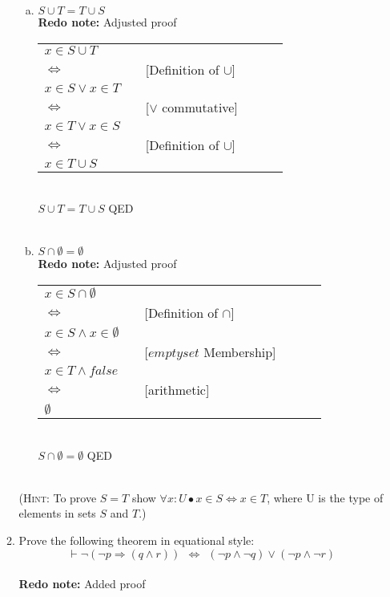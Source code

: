 \documentclass{article}
\renewcommand{\implies}{\Rightarrow}
\renewcommand{\iff}{\Leftrightarrow}
\begin{document}
\begin{enumerate}[\bf I.]
\begin{enumerate}[1.]
\begin{enumerate}[a.]
\item $S\cup T=T\cup S$ \\
  \textbf{Redo note:} Adjusted proof \\
 \begin{tabular}{l ll lll}
     $x \in S \cup T $  &    &  \\
     $\iff$ &   & [Definition of $\cup$] \\
     $x \in S \lor x \in T$  &    &  \\
     $\iff$ &   & [$\lor$ commutative] \\
     $ x \in T \lor x \in S$  & & \\
     $\iff$  &   & [Definition of $\cup$]  \\
     $x \in T \cup S $  &    &  \\
 \end{tabular} \\
 $S\cup T=T\cup S$ QED \\
\\  
\item $S\cap\emptyset= \emptyset$ \\
  \textbf{Redo note:} Adjusted proof \\
  \begin{tabular}{l ll lll}
     $ x \in S\cap\emptyset$  &    &  \\
    $\iff$ &   & [Definition of $\cap$] \\
    $x \in S \land x \in \emptyset $ & & \\
    $\iff$ &   & [$emptyset$ Membership]\\
    $ x \in T \land false $ & &\\
    $\iff$ &   & [arithmetic] \\
    ${\emptyset}$ & & \\
  \end{tabular} \\
  $S\cap\emptyset= \emptyset$ QED \\
\\ 
\end{enumerate}
(\textsc{Hint}: To prove $S=T$ show $\forall x: U \bullet x \in S\Leftrightarrow x\in T$, where U is the type of elements in sets $S$ and $T$.)
\item Prove the following theorem in equational style:
  $$ \vdash \neg(\neg p \implies (q\land r))~~\iff~~(\neg p\land \neg q)\lor(\neg p\land\neg r)$$ \\
  \textbf{Redo note:} Added proof \\ 

\end{enumerate}
\end{enumerate}
\end{document}
